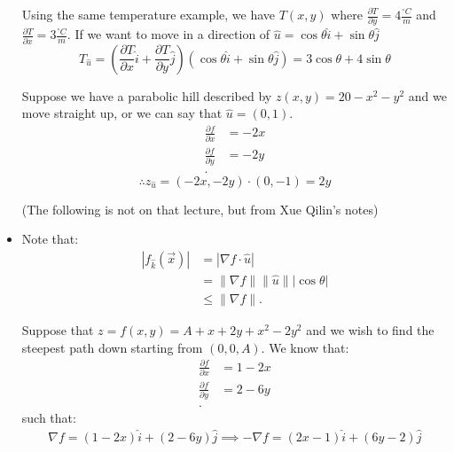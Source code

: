 \begin{itemize}
\begin{example}
	Using the same temperature example, we have $T\left( x, y \right) $ where $\frac{\partial T}{\partial y} = 4 \frac{^\circ C}{m}$ and $\frac{\partial T}{\partial x} = 3 \frac{^\circ C}{m}$. If we want to move in a direction of $\hat{u} = \cos\theta \hat{i} + \sin \theta \hat{j}$
	\begin{equation}
		T_{\hat{u}} = \left( \frac{\partial T}{\partial x} \hat{i} + \frac{\partial T}{\partial y} \hat{j} \right)\left( \cos \theta \hat{i} + \sin \theta \hat{j} \right)  = 3\cos\theta + 4\sin\theta
	\end{equation}
\end{example}
\begin{example}
	Suppose we have a parabolic hill described by $z\left( x,y \right)  = 20 - x^2 - y^{2}$ and we move straight up, or we can say that $\hat{u} = \left( 0,1 \right) $.
	\begin{align*}
		\frac{\partial f}{\partial x}  &= -2x \\
		\frac{\partial f}{\partial y}  &=  -2y \\
	.\end{align*}
	\begin{equation}
		\therefore z_{\hat{u}} = \left( -2x, -2y \right) \cdot \left( 0, -1 \right) = 2y
	\end{equation}
\end{example}
(The following is not on that lecture, but from Xue Qilin's notes)
\item Note that:
	\begin{align*}
		|f_{\hat{k}}\left( \vec{x} \right) | &= |\nabla f \cdot  \hat{u}|\\
		&= \lVert \nabla f \rVert \lVert \hat{u} \rVert |\cos\theta| \\
		&\le \lVert \nabla f \rVert	
	.\end{align*}
	\begin{example}
		Suppose that $z = f\left( x,y \right) = A + x + 2y + x^2 - 2y^2$ and we wish to find the steepest path down starting from $\left( 0,0,A \right) $. We know that:
		\begin{align*}
			\frac{\partial f}{\partial x}  &= 1-2x \\
			\frac{\partial f}{\partial y} &= 2-6y \\
		.\end{align*}
		such that:
		\begin{align*}
			\nabla f = \left( 1-2x \right) \hat{i} + \left( 2-6y \right) \hat{j} \implies - \nabla f = \left( 2x-1 \right) \hat{i} + \left( 6y-2 \right) \hat{j} 

\end{align*}
\end{example}
\end{itemize}
